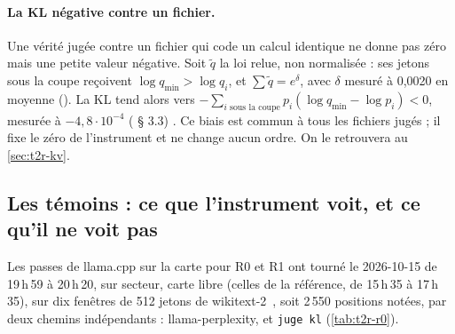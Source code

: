 \paragraph{La KL négative contre un fichier.} Une vérité jugée contre un fichier qui code un calcul identique ne donne pas zéro mais une petite valeur négative. Soit $\tilde q$ la loi relue, non normalisée : ses jetons sous la coupe reçoivent $\log q_{\min} > \log q_i$, et $\sum\tilde q = e^{\delta}$, avec $\delta$ mesuré à 0,0020 en moyenne (). La KL tend alors vers $-\sum_{i \text{ sous la coupe}} p_i(\log q_{\min} - \log p_i) < 0$, mesurée à $-4{,}8\cdot10^{-4}$ ( § 3.3) \mes. Ce biais est commun à tous les fichiers jugés ; il fixe le zéro de l'instrument et ne change aucun ordre. On le retrouvera au \cref{sec:t2r-kv}.

\subsection{Les témoins : ce que l'instrument voit, et ce qu'il ne voit pas}\label{sec:t2r-temoins}

Les passes de llama.cpp sur la carte pour R0 et R1 ont tourné le 2026-10-15 de 19\,h\,59 à 20\,h\,20, sur secteur, carte libre (celles de la référence, de 15\,h\,35 à 17\,h\,35), sur dix fenêtres de 512 jetons de wikitext-2~\cite{merity2016wikitext}, soit 2\,550 positions notées, par deux chemins indépendants : llama-perplexity, et \texttt{juge kl} (\cref{tab:t2r-r0}).

